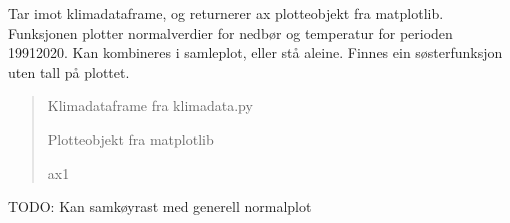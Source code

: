 \documentclass[letterpaper,10pt,norsk]{sphinxmanual}
\begin{document}
\begin{fulllineitems}
\label{\detokenize{index:klimadata.plot.normaler_annotert}}
\pysigstartsignatures
{}
\pysigstopsignatures
\sphinxAtStartPar
Tar imot klimadataframe, og returnerer ax plotteobjekt fra matplotlib.
Funksjonen plotter normalverdier for nedbør og temperatur for perioden 1991\sphinxhyphen{}2020.
Kan kombineres i samleplot, eller stå aleine.
Finnes ein søsterfunksjon uten tall på plottet.
\begin{quote}\begin{description}
\sphinxAtStartPar
{} \textendash{} Klimadataframe fra klimadata.py

\sphinxAtStartPar
Plotteobjekt fra matplotlib

\sphinxAtStartPar
ax1

\end{description}\end{quote}

\sphinxAtStartPar
TODO: Kan samkøyrast med generell normalplot

\end{fulllineitems}

\end{document}
